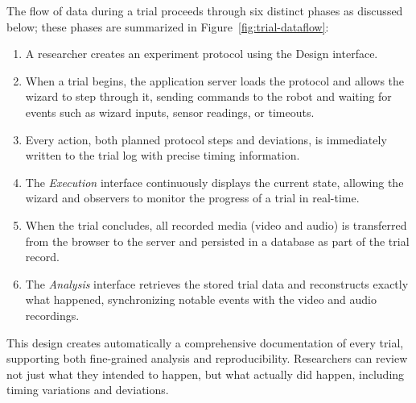 The flow of data during a trial proceeds through six distinct phases as discussed below; these phases are summarized in Figure~\ref{fig:trial-dataflow}:

\begin{enumerate}
\item A researcher creates an experiment protocol using the Design interface.
\item When a trial begins, the application server loads the protocol and allows the wizard to step through it, sending commands to the robot and waiting for events such as wizard inputs, sensor readings, or timeouts.
\item Every action, both planned protocol steps and deviations, is immediately written to the trial log with precise timing information.
\item The \emph{Execution} interface continuously displays the current state, allowing the wizard and observers to monitor the progress of a trial in real-time.
\item When the trial concludes, all recorded media (video and audio) is transferred from the browser to the server and persisted in a database as part of the trial record.
\item The \emph{Analysis} interface retrieves the stored trial data and reconstructs exactly what happened, synchronizing notable events with the video and audio recordings.
\end{enumerate}

This design creates automatically a comprehensive documentation of every trial, supporting both fine-grained analysis and reproducibility. Researchers can review not just what they intended to happen, but what actually did happen, including timing variations and deviations.

